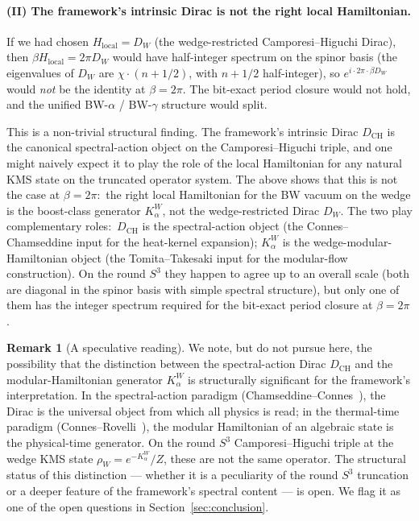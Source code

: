 \documentclass[11pt,a4paper]{article}
\theoremstyle{plain}
\theoremstyle{definition}
\newtheorem{remark}[theorem]{Remark}
\newcommand{\sthree}{S^{3}}
\newcommand{\DCH}{D_{\mathrm{CH}}}
\begin{document}
\paragraph{(II) The framework's intrinsic Dirac is not the right
local Hamiltonian.}
If we had chosen $H_{\mathrm{local}} = D_W$ (the wedge-restricted
Camporesi--Higuchi Dirac), then $\beta H_{\mathrm{local}} = 2\pi D_W$
would have half-integer spectrum on the spinor basis (the eigenvalues
of $D_W$ are $\chi \cdot (n + 1/2)$, with $n + 1/2$ half-integer), so
$e^{i \cdot 2\pi \cdot \beta D_W}$ would \emph{not} be the identity at
$\beta = 2\pi$. The bit-exact period closure would not hold, and the
unified BW-$\alpha$ / BW-$\gamma$ structure would split.

This is a non-trivial structural finding. The framework's intrinsic
Dirac $\DCH$ is the canonical spectral-action object on the
Camporesi--Higuchi triple, and one might naively expect it to play the
role of the local Hamiltonian for any natural KMS state on the
truncated operator system. The above shows that this is not the case
at $\beta = 2\pi$:\ the right local Hamiltonian for the BW vacuum on
the wedge is the boost-class generator $K_\alpha^W$, not the
wedge-restricted Dirac $D_W$. The two play complementary roles:\
$\DCH$ is the spectral-action object (the Connes--Chamseddine input
for the heat-kernel expansion); $K_\alpha^W$ is the
wedge-modular-Hamiltonian object (the Tomita--Takesaki input for the
modular-flow construction). On the round $\sthree$ they happen to
agree up to an overall scale (both are diagonal in the spinor basis
with simple spectral structure), but only one of them has the integer
spectrum required for the bit-exact period closure at $\beta = 2\pi$.

\begin{remark}[A speculative reading]\label{rem:speculation}
We note, but do not pursue here, the possibility that the
distinction between the spectral-action Dirac $\DCH$ and the
modular-Hamiltonian generator $K_\alpha^W$ is structurally significant
for the framework's interpretation. In the spectral-action paradigm
(Chamseddine--Connes~\cite{chamseddine_connes2010}), the Dirac is the
universal object from which all physics is read; in the
thermal-time paradigm (Connes--Rovelli~\cite{connes_rovelli1994}), the
modular Hamiltonian of an algebraic state is the physical-time generator.
On the round $\sthree$ Camporesi--Higuchi triple at the wedge KMS
state $\rho_W = e^{-K_\alpha^W}/Z$, these are not the same operator.
The structural status of this distinction --- whether it is a
peculiarity of the round $\sthree$ truncation or a deeper feature of
the framework's spectral content --- is open. We flag it as one of
the open questions in Section~\ref{sec:conclusion}.
\end{remark}
\end{document}
